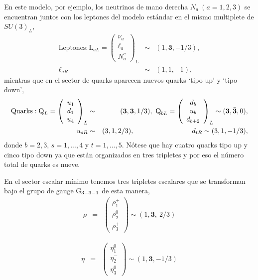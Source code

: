 En este modelo, por ejemplo, los neutrinos de mano derecha $N_a \ (a=1,2,3)$ se encuentran juntos con los leptones del modelo estándar en el mismo multiplete de $SU(3)_L$,
\begin{eqnarray}
\text{Leptones} : \text{L}_{aL} = \left( \begin{array}{c}
\nu_a \\ \ell_a  \\ N_a^c
\end{array} \right)_L &\sim & (1, \textbf{3},-1/3), \nonumber \\
\ell_{aR} &\sim & (1,1,-1),
\end{eqnarray}
mientras que en el sector de quarks aparecen nuevos quarks `tipo up' y `tipo down',
\begin{eqnarray}
\text{Quarks} : \text{Q}_{L} = \left( \begin{array}{c}
u_1 \\ d_1  \\ u_4
\end{array} \right)_L &\sim &  (\textbf{3}, \textbf{3},1/3), \
\text{Q}_{bL} = \left( \begin{array}{c}
d_b \\ u_b  \\ d_{b+2}
\end{array} \right)_L \sim  (\textbf{3}, \bar{\textbf{3}},0), \nonumber \\
u_{sR} &\sim & (3,1,2/3), \hspace{1.15in} d_{tR} \sim  (3,1,-1/3), \nonumber \\
\end{eqnarray}
donde $b=2,3$, $s=1,...,4$ y $t=1,...,5$. Nótese que hay cuatro quarks tipo up y cinco tipo down ya que están organizados en tres tripletes y por eso el número total de quarks es nueve.

En el sector escalar mínimo tenemos tres tripletes escalares que se transforman bajo el grupo de gauge G$_{\rm 3-3-1}$ de esta manera,
\begin{eqnarray}
\rho &=& \left( \begin{array}{c}
\rho_1^+ \\ \rho_2^0  \\ \rho_3^+
\end{array} \right)  \sim (1, \textbf{3}, \ 2/3)
\end{eqnarray}

\begin{eqnarray}
\eta &=& \left( \begin{array}{c}
\eta_1^0 \\ \eta_2^-  \\ \eta_3^0
\end{array} \right) \sim (1, \textbf{3}, -1/3)
\end{eqnarray}


